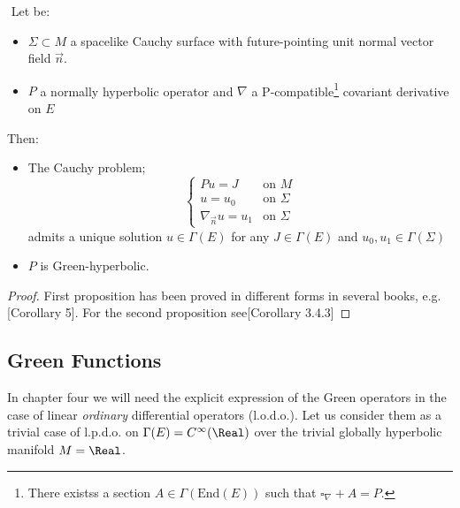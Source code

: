 \documentclass[Main]{subfiles}
\begin{document}
	\begin{theorem}
	$ $
			Let be:
			\begin{itemize}
				\item $\Sigma \subset M$ a spacelike Cauchy surface with future-pointing unit normal vector field $\vec{n}$.
				\item $P$ a normally hyperbolic operator and $\nabla$ a P-compatible\footnote{There existss a section $A \in \Gamma(\textrm{End}(E))$ such that $\square_\nabla + A = P$.} covariant derivative on $E$
			\end{itemize}
		Then:
		\begin{itemize}
			\item The Cauchy problem;
				\begin{displaymath}
					\begin{cases}
						P u = J & \textrm{on $M$} \\
						u = u_0 & \textrm{on $\Sigma$}\\
						\nabla_{\vec{n}}u= u_1  & \textrm{on $\Sigma$}
					\end{cases}
				\end{displaymath}
				admits a unique solution $u\in \Gamma(E)$ for any $J\in \Gamma(E)$ and $ u_0,u_1 \in \Gamma(\Sigma)$
			\item $P$ is Green-hyperbolic.
		\end{itemize}
	\end{theorem}
	\begin{proof}
		First proposition has been proved in different forms in several books, e.g. \cite{Bar2009}[Corollary 5].
		For the second proposition see\cite{Baer2008}[Corollary 3.4.3]
	\end{proof}

	\subsection{Green Functions}\label{Section:GreenFunctions}
	In chapter four we will need the explicit expression of the Green operators in the case of linear \textit{ordinary } differential operators (l.o.d.o.).
	Let us consider them as a trivial case of l.p.d.o. on $\Gamma(E) = C^\infty(\Real)$ over the trivial globally hyperbolic manifold $M=\Real$.
\end{document}
